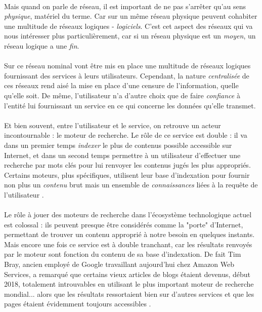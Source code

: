 \paragraph{} Mais quand on parle de réseau, il est important de ne pas s'arrêter qu'au sens \emph{physique}, matériel du
terme. Car sur un même réseau physique peuvent cohabiter une multitude de réseaux logiques - \emph{logiciels}. C'est cet
aspect des réseaux qui va nous intéresser plus particulièrement, car si un réseau physique est un \emph{moyen}, un réseau
logique a une \emph{fin}.

\paragraph{} Sur ce réseau nominal vont être mis en place une multitude de réseaux logiques fournissant des services à
leurs utilisateurs. Cependant, la nature \emph{centralisée} de ces réseaux rend aisé la mise en place d'une censure de
l'information, quelle qu'elle soit. De même, l'utilisateur n'a d'autre choix que de faire \emph{confiance} à l'entité
lui fournissant un service en ce qui concerne les données qu'elle transmet.

\paragraph{} Et bien souvent, entre l'utilisateur et le service, on retrouve un acteur incontournable : le moteur de
recherche. Le rôle de ce service est double : il va dans un premier temps \emph{indexer} le plus de contenus possible
accessible sur Internet, et dans un second temps permettre à un utilisateur d'effectuer une recherche par mots clés 
pour lui renvoyer les contenus jugés les plus appropriés. Certains moteurs, plus spécifiques, utilisent leur base
d'indexation pour fournir non plus un \emph{contenu} brut mais un ensemble de \emph{connaissances} liées à la requête
de l'utilisateur \cite{Internet2}.

\paragraph{} Le rôle à jouer des moteurs de recherche dans l'écosystème technologique actuel est colossal : ils peuvent
presque être considérés comme la "porte" d'Internet, permettant de trouver un contenu approprié à notre besoin en quelques
instants. Mais encore une fois ce service est à double tranchant, car les résultats renvoyés par le moteur sont fonction
du contenu de sa base d'indexation. De fait Tim Bray, ancien employé de Google travaillant aujourd'hui chez Amazon Web Services,
a remarqué que certains vieux articles de blogs étaient devenus, début 2018, totalement introuvables en utilisant le plus
important moteur de recherche mondial... alors que les résultats ressortaient bien sur d'autres services et que les pages 
étaient évidemment toujours accessibles \cite{Internet3}.


